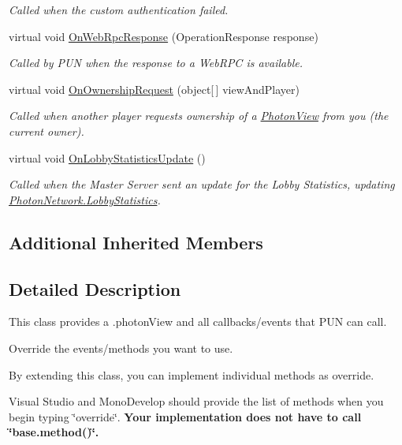 \begin{DoxyCompactItemize}
\begin{DoxyCompactList}\small\item\em Called when the custom authentication failed. \end{DoxyCompactList}\item 
virtual void \hyperlink{class_photon_1_1_pun_behaviour_abddb6286cecb1409cbca26088328e86d}{On\+Web\+Rpc\+Response} (Operation\+Response response)
\begin{DoxyCompactList}\small\item\em Called by P\+UN when the response to a Web\+R\+PC is available. \end{DoxyCompactList}\item 
virtual void \hyperlink{class_photon_1_1_pun_behaviour_a943727ed00dbd38afc4b7d16c9c3454d}{On\+Ownership\+Request} (object\mbox{[}$\,$\mbox{]} view\+And\+Player)
\begin{DoxyCompactList}\small\item\em Called when another player requests ownership of a \hyperlink{class_photon_view}{Photon\+View} from you (the current owner). \end{DoxyCompactList}\item 
virtual void \hyperlink{class_photon_1_1_pun_behaviour_a945651c506d001121aa81e4fc8010a42}{On\+Lobby\+Statistics\+Update} ()
\begin{DoxyCompactList}\small\item\em Called when the Master Server sent an update for the Lobby Statistics, updating \hyperlink{class_photon_network_abdced09cccf61ae817cb97705ffce137}{Photon\+Network.\+Lobby\+Statistics}. \end{DoxyCompactList}\end{DoxyCompactItemize}
\subsection*{Additional Inherited Members}


\subsection{Detailed Description}
This class provides a .photon\+View and all callbacks/events that P\+UN can call. 

Override the events/methods you want to use. 

By extending this class, you can implement individual methods as override.

Visual Studio and Mono\+Develop should provide the list of methods when you begin typing \char`\"{}override\char`\"{}. {\bfseries Your implementation does not have to call \char`\"{}base.\+method()\char`\"{}.}

